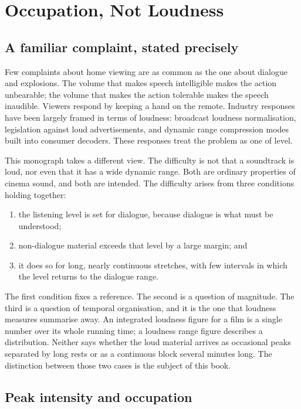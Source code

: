 \chapter{Occupation, Not Loudness}
\label{ch:intro}

\section{A familiar complaint, stated precisely}

Few complaints about home viewing are as common as the one about dialogue and explosions. The volume that makes speech intelligible makes the action unbearable; the volume that makes the action tolerable makes the speech inaudible. Viewers respond by keeping a hand on the remote. Industry responses have been largely framed in terms of loudness: broadcast loudness normalisation, legislation against loud advertisements, and dynamic range compression modes built into consumer decoders. These responses treat the problem as one of level.

This monograph takes a different view. The difficulty is not that a soundtrack is loud, nor even that it has a wide dynamic range. Both are ordinary properties of cinema sound, and both are intended. The difficulty arises from three conditions holding together:
\begin{enumerate}
\item the listening level is set for dialogue, because dialogue is what must be understood;
\item non-dialogue material exceeds that level by a large margin; and
\item it does so for long, nearly continuous stretches, with few intervals in which the level returns to the dialogue range.
\end{enumerate}
The first condition fixes a reference. The second is a question of magnitude. The third is a question of temporal organisation, and it is the one that loudness measures summarise away. An integrated loudness figure for a film is a single number over its whole running time; a loudness range figure describes a distribution. Neither says whether the loud material arrives as occasional peaks separated by long rests or as a continuous block several minutes long. The distinction between those two cases is the subject of this book.

\section{Peak intensity and occupation}

